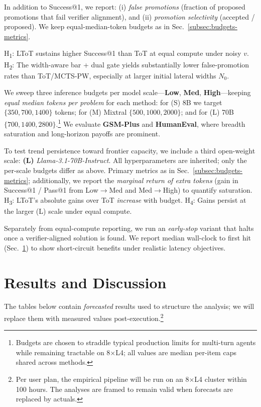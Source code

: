 \documentclass{article}
\begin{document}
In addition to Success@1, we report: (i) \emph{false promotions} (fraction of proposed promotions that fail verifier alignment), and (ii) \emph{promotion selectivity} (accepted / proposed).
We keep equal-median-token budgets as in Sec.~\ref{subsec:budgets-metrics}.

H\textsubscript{1}: LToT sustains higher Success@1 than ToT at equal compute under noisy $v$.
H\textsubscript{2}: The width-aware bar + dual gate yields substantially lower false-promotion rates than ToT/MCTS-PW, especially at larger initial lateral widths $N_0$.

We sweep three inference budgets per model scale—\textbf{Low}, \textbf{Med}, \textbf{High}—keeping \emph{equal median tokens per problem} for each method:
for (S) 8B we target $\{350,700,1400\}$ tokens; for (M) Mixtral $\{500,1000,2000\}$; and for (L) 70B $\{700,1400,2800\}$.\footnote{Budgets are chosen to straddle typical production limits for multi-turn agents while remaining tractable on 8$\times$L4; all values are median per-item caps shared across methods.}
We evaluate \textbf{GSM-Plus} and \textbf{HumanEval}, where breadth saturation and long-horizon payoffs are prominent.

To test trend persistence toward frontier capacity, we include a third open-weight scale:
\textbf{(L)} \emph{Llama-3.1-70B-Instruct}.
All hyperparameters are inherited; only the per-scale budgets differ as above.
Primary metrics as in Sec.~\ref{subsec:budgets-metrics}; additionally, we report the \emph{marginal return of extra tokens} (gain in Success@1 / Pass@1 from Low$\to$Med and Med$\to$High) to quantify saturation.
H\textsubscript{3}: LToT's absolute gains over ToT \emph{increase} with budget.
H\textsubscript{4}: Gains persist at the larger (L) scale under equal compute.

Separately from equal-compute reporting, we run an \emph{early-stop} variant that halts once a verifier-aligned solution is found.
We report median wall-clock to first hit (Sec.~\ref{section:results}) to show short-circuit benefits under realistic latency objectives.

\section{Results and Discussion}
\label{section:results}

The tables below contain \emph{forecasted} results used to structure the analysis; we will replace them with measured values post-execution.\footnote{Per user plan, the empirical pipeline will be run on an 8$\times$L4 cluster within 100 hours. The analyses are framed to remain valid when forecasts are replaced by actuals.}
\end{document}
